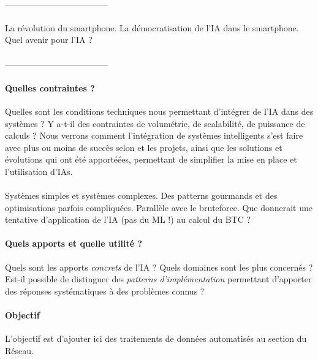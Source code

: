 \paragraph{} ------------------------------------

\paragraph{} La révolution du smartphone. La démocratisation de l'IA dans le smartphone.
Quel avenir pour l'IA ?

\paragraph{} ------------------------------------

\paragraph{Quelles contraintes ?} Quelles sont les conditions techniques nous
permettant d'intégrer de l'IA dans des systèmes ? Y a-t-il des contraintes de
volumétrie, de scalabilité, de puissance de calculs ? Nous verrons comment
l'intégration de systèmes intelligents s'est faire avec plus ou moins de succès
selon et les projets, ainsi que les solutions et évolutions qui ont été apportéées,
permettant de simplifier la mise en place et l'utilisation d'IAs.

\paragraph{} Systèmes simples et systèmes complexes. Des patterns gourmands et
des optimisations parfois compliquées. Parallèle avec le bruteforce. Que donnerait 
une tentative d'application de l'IA (pas du ML !) au calcul du BTC ?

\paragraph{Quels apports et quelle utilité ?} Quels sont les apports \emph{concrets}
de l'IA ? Quels domaines sont les plus concernés ? Est-il possible de distinguer
des \emph{patterns d'implémentation} permettant d'apporter des réponses systématiques
à des problèmes connus ?

\paragraph{Objectif} L'objectif est d'ajouter ici des traitements de données automatisés au section
du Réseau.

